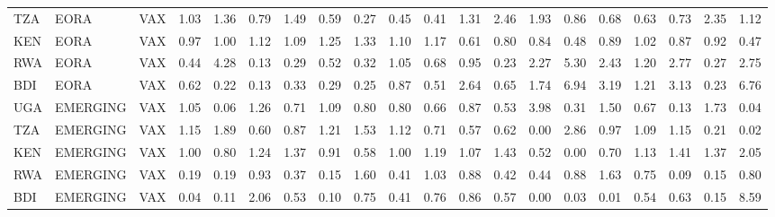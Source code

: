 \documentclass[a4paper]{article}
\begin{document}
\begin{table}[ht]
{\begin{tabular}{lllrrrrrrrrrrrrrrrrr}
  TZA & EORA & VAX & 1.03 & 1.36 & 0.79 & 1.49 & 0.59 & 0.27 & 0.45 & 0.41 & 1.31 & 2.46 & 1.93 & 0.86 & 0.68 & 0.63 & 0.73 & 2.35 & 1.12 \\ 
  KEN & EORA & VAX & 0.97 & 1.00 & 1.12 & 1.09 & 1.25 & 1.33 & 1.10 & 1.17 & 0.61 & 0.80 & 0.84 & 0.48 & 0.89 & 1.02 & 0.87 & 0.92 & 0.47 \\ 
  RWA & EORA & VAX & 0.44 & 4.28 & 0.13 & 0.29 & 0.52 & 0.32 & 1.05 & 0.68 & 0.95 & 0.23 & 2.27 & 5.30 & 2.43 & 1.20 & 2.77 & 0.27 & 2.75 \\ 
  BDI & EORA & VAX & 0.62 & 0.22 & 0.13 & 0.33 & 0.29 & 0.25 & 0.87 & 0.51 & 2.64 & 0.65 & 1.74 & 6.94 & 3.19 & 1.21 & 3.13 & 0.23 & 6.76 \\ \midrule
  UGA & EMERGING & VAX & 1.05 & 0.06 & 1.26 & 0.71 & 1.09 & 0.80 & 0.80 & 0.66 & 0.87 & 0.53 & 3.98 & 0.31 & 1.50 & 0.67 & 0.13 & 1.73 & 0.04 \\ 
  TZA & EMERGING & VAX & 1.15 & 1.89 & 0.60 & 0.87 & 1.21 & 1.53 & 1.12 & 0.71 & 0.57 & 0.62 & 0.00 & 2.86 & 0.97 & 1.09 & 1.15 & 0.21 & 0.02 \\ 
  KEN & EMERGING & VAX & 1.00 & 0.80 & 1.24 & 1.37 & 0.91 & 0.58 & 1.00 & 1.19 & 1.07 & 1.43 & 0.52 & 0.00 & 0.70 & 1.13 & 1.41 & 1.37 & 2.05 \\ 
  RWA & EMERGING & VAX & 0.19 & 0.19 & 0.93 & 0.37 & 0.15 & 1.60 & 0.41 & 1.03 & 0.88 & 0.42 & 0.44 & 0.88 & 1.63 & 0.75 & 0.09 & 0.15 & 0.80 \\ 
  BDI & EMERGING & VAX & 0.04 & 0.11 & 2.06 & 0.53 & 0.10 & 0.75 & 0.41 & 0.76 & 0.86 & 0.57 & 0.00 & 0.03 & 0.01 & 0.54 & 0.63 & 0.15 & 8.59 \\ \midrule
  

\end{tabular}}
\end{table}
\end{document}
